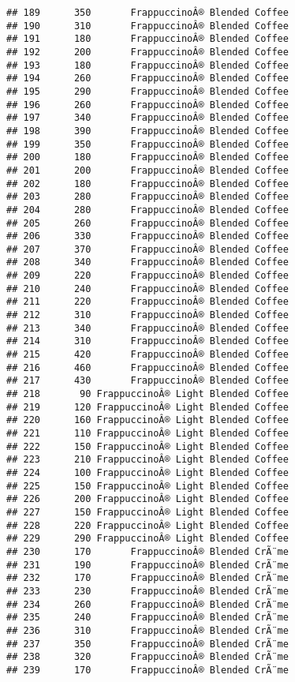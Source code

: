 \documentclass[
]{article}
\begin{document}
\begin{verbatim}
## 189      350       FrappuccinoÂ® Blended Coffee
## 190      310       FrappuccinoÂ® Blended Coffee
## 191      180       FrappuccinoÂ® Blended Coffee
## 192      200       FrappuccinoÂ® Blended Coffee
## 193      180       FrappuccinoÂ® Blended Coffee
## 194      260       FrappuccinoÂ® Blended Coffee
## 195      290       FrappuccinoÂ® Blended Coffee
## 196      260       FrappuccinoÂ® Blended Coffee
## 197      340       FrappuccinoÂ® Blended Coffee
## 198      390       FrappuccinoÂ® Blended Coffee
## 199      350       FrappuccinoÂ® Blended Coffee
## 200      180       FrappuccinoÂ® Blended Coffee
## 201      200       FrappuccinoÂ® Blended Coffee
## 202      180       FrappuccinoÂ® Blended Coffee
## 203      280       FrappuccinoÂ® Blended Coffee
## 204      280       FrappuccinoÂ® Blended Coffee
## 205      260       FrappuccinoÂ® Blended Coffee
## 206      330       FrappuccinoÂ® Blended Coffee
## 207      370       FrappuccinoÂ® Blended Coffee
## 208      340       FrappuccinoÂ® Blended Coffee
## 209      220       FrappuccinoÂ® Blended Coffee
## 210      240       FrappuccinoÂ® Blended Coffee
## 211      220       FrappuccinoÂ® Blended Coffee
## 212      310       FrappuccinoÂ® Blended Coffee
## 213      340       FrappuccinoÂ® Blended Coffee
## 214      310       FrappuccinoÂ® Blended Coffee
## 215      420       FrappuccinoÂ® Blended Coffee
## 216      460       FrappuccinoÂ® Blended Coffee
## 217      430       FrappuccinoÂ® Blended Coffee
## 218       90 FrappuccinoÂ® Light Blended Coffee
## 219      120 FrappuccinoÂ® Light Blended Coffee
## 220      160 FrappuccinoÂ® Light Blended Coffee
## 221      110 FrappuccinoÂ® Light Blended Coffee
## 222      150 FrappuccinoÂ® Light Blended Coffee
## 223      210 FrappuccinoÂ® Light Blended Coffee
## 224      100 FrappuccinoÂ® Light Blended Coffee
## 225      150 FrappuccinoÂ® Light Blended Coffee
## 226      200 FrappuccinoÂ® Light Blended Coffee
## 227      150 FrappuccinoÂ® Light Blended Coffee
## 228      220 FrappuccinoÂ® Light Blended Coffee
## 229      290 FrappuccinoÂ® Light Blended Coffee
## 230      170       FrappuccinoÂ® Blended CrÃ¨me
## 231      190       FrappuccinoÂ® Blended CrÃ¨me
## 232      170       FrappuccinoÂ® Blended CrÃ¨me
## 233      230       FrappuccinoÂ® Blended CrÃ¨me
## 234      260       FrappuccinoÂ® Blended CrÃ¨me
## 235      240       FrappuccinoÂ® Blended CrÃ¨me
## 236      310       FrappuccinoÂ® Blended CrÃ¨me
## 237      350       FrappuccinoÂ® Blended CrÃ¨me
## 238      320       FrappuccinoÂ® Blended CrÃ¨me
## 239      170       FrappuccinoÂ® Blended CrÃ¨me

\end{verbatim}
\end{document}
